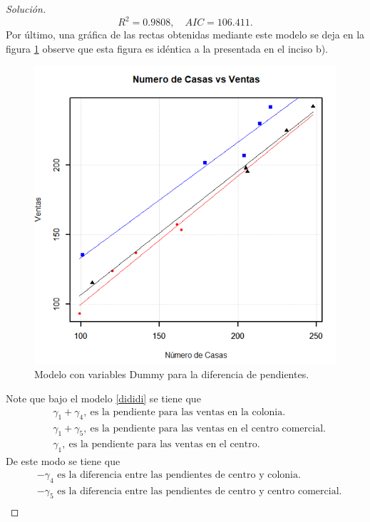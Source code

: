 \documentclass[10.5pt,notitlepage]{article}
\newenvironment{solucion}
  {\begin{proof}[Solución]}
  {\end{proof}}
\theoremstyle{plain}
\begin{document}
\begin{solucion}
\begin{equation}\label{AIC RRRR2}
    R^2 = 0.9808, \quad AIC = 106.411.
\end{equation}
Por último, una gráfica de las rectas obtenidas mediante este modelo se deja en la figura \ref{fig:23} observe que esta figura es idéntica a la presentada en el inciso b).
\begin{figure}[htb]
 \centering
 \includegraphics[scale = 0.65]{chingas a tu madre dembelé.png}
 \caption{Modelo con variables Dummy para la diferencia de pendientes.}
\label{fig:23}
\end{figure}
Note que bajo el modelo \eqref{dididi} se tiene que 
\begin{align*}
    &\gamma_1 +\gamma_4, \ \text{es la pendiente para las ventas en la colonia.} \\
    &\gamma_1 + \gamma_5, \ \text{es la pendiente para las ventas en el centro comercial.}\\ 
    &\gamma_1, \ \text{es la pendiente para las ventas en el centro.} 
\end{align*}
De este modo se tiene que 
\begin{align*}
    &-\gamma_4 \text{ es la diferencia entre las pendientes de centro y colonia}.\\
    &-\gamma_5 \text{ es la diferencia entre las pendientes de centro y centro comercial}.\\

\end{align*}
\end{solucion}
\end{document}

